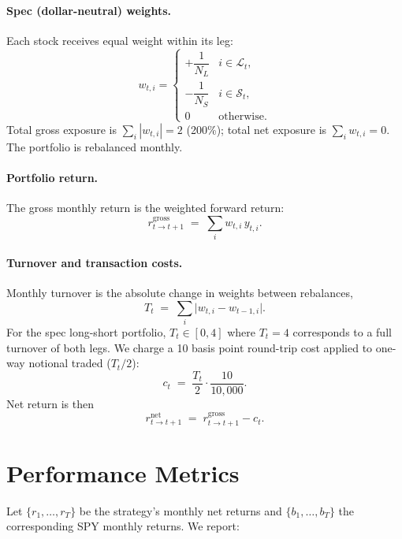 \documentclass[11pt]{article}
\begin{document}
\paragraph{Spec (dollar-neutral) weights.} Each stock receives equal weight within its
leg:
\begin{equation}
w_{t,i} = \begin{cases}
+\dfrac{1}{N_L} & i \in \mathcal{L}_t, \\[6pt]
-\dfrac{1}{N_S} & i \in \mathcal{S}_t, \\[6pt]
0 & \text{otherwise}.
\end{cases}
\end{equation}
Total gross exposure is $\sum_i |w_{t,i}| = 2$ (200\%); total net exposure is
$\sum_i w_{t,i} = 0$. The portfolio is rebalanced monthly.

\paragraph{Portfolio return.} The gross monthly return is the weighted forward return:
\begin{equation}
r^{\text{gross}}_{t \to t+1} \;=\; \sum_{i} w_{t,i}\,y_{t,i}.
\end{equation}

\paragraph{Turnover and transaction costs.} Monthly turnover is the absolute change in
weights between rebalances,
\begin{equation}
T_t \;=\; \sum_i \big| w_{t,i} - w_{t-1,i} \big|.
\end{equation}
For the spec long-short portfolio, $T_t \in [0, 4]$ where $T_t=4$ corresponds to a full
turnover of both legs. We charge a 10 basis point round-trip cost applied to one-way
notional traded ($T_t/2$):
\begin{equation}
c_t \;=\; \frac{T_t}{2} \cdot \frac{10}{10{,}000}.
\end{equation}
Net return is then
\begin{equation}
r^{\text{net}}_{t \to t+1} \;=\; r^{\text{gross}}_{t \to t+1} - c_t.
\end{equation}

\section{Performance Metrics}
\label{sec:metrics}
Let $\{r_1, \dots, r_T\}$ be the strategy's monthly net returns and $\{b_1, \dots, b_T\}$
the corresponding SPY monthly returns. We report:
\end{document}
